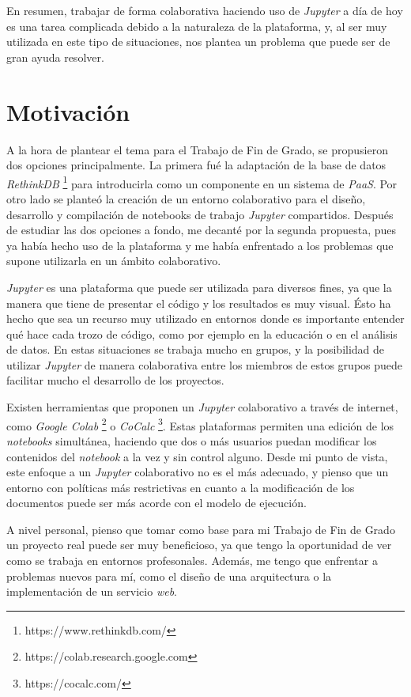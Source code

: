 \documentclass[11pt,spanish,listoffigures]{tfgetsinf}
\begin{document}
En resumen, trabajar de forma colaborativa haciendo uso de \textit{Jupyter} a día de hoy es una tarea complicada debido a la naturaleza de la plataforma, y, al ser muy utilizada en este tipo de situaciones, nos plantea un problema que puede ser de gran ayuda resolver.



\section{Motivaci\'on}
\label{sec:motivacion}

A la hora de plantear el tema para el Trabajo de Fin de Grado, se propusieron dos opciones principalmente. La primera fué la adaptación de la base de datos \textit{RethinkDB} \footnote{https://www.rethinkdb.com/} para introducirla como un componente en un sistema de \textit{PaaS}. Por otro lado se planteó la creación de un entorno colaborativo para el diseño, desarrollo y compilación de notebooks de trabajo \textit{Jupyter} compartidos. Después de estudiar las dos opciones a fondo, me decanté por la segunda propuesta, pues ya había hecho uso de la plataforma y me había enfrentado a los problemas que supone utilizarla en un ámbito colaborativo.

\textit{Jupyter} es una plataforma que puede ser utilizada para diversos fines, ya que la manera que tiene de presentar el código y los resultados es muy visual. Ésto ha hecho que sea un recurso muy utilizado en entornos donde es importante entender qué hace cada trozo de código, como por ejemplo en la educación o en el análisis de datos. En estas situaciones se trabaja mucho en grupos, y la posibilidad de utilizar \textit{Jupyter} de manera colaborativa entre los miembros de estos grupos puede facilitar mucho el desarrollo de los proyectos.

Existen herramientas que proponen un \textit{Jupyter} colaborativo a través de internet, como \textit{Google Colab} \footnote{https://colab.research.google.com} o \textit{CoCalc} \footnote{https://cocalc.com/}. Estas plataformas permiten una edición de los \textit{notebooks} simultánea, haciendo que dos o más usuarios puedan modificar los contenidos del \textit{notebook} a la vez y sin control alguno. Desde mi punto de vista, este enfoque a un \textit{Jupyter} colaborativo no es el más adecuado, y pienso que un entorno con políticas más restrictivas en cuanto a la modificación de los documentos puede ser más acorde con el modelo de ejecución.

A nivel personal, pienso que tomar como base para mi Trabajo de Fin de Grado un proyecto real puede ser muy beneficioso, ya que tengo la oportunidad de ver como se trabaja en entornos profesonales. Además, me tengo que enfrentar a problemas nuevos para mí, como el diseño de una arquitectura o la implementación de un servicio \textit{web}. 
\end{document}

